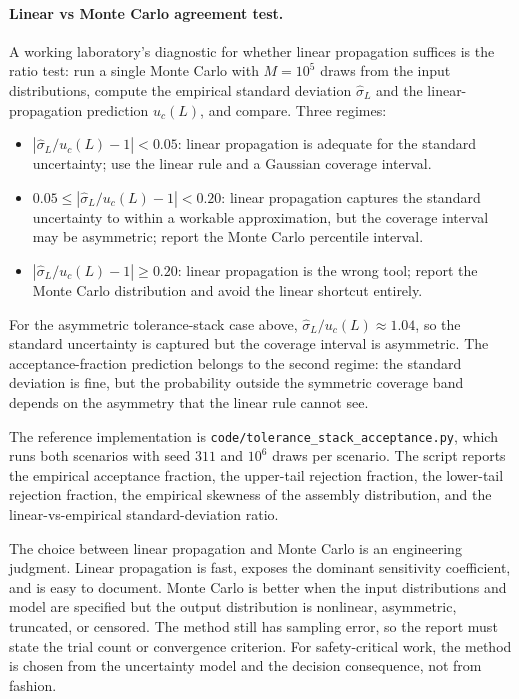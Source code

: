 \paragraph{Linear vs Monte Carlo agreement test.} A working
laboratory's diagnostic for whether linear propagation suffices is
the ratio test: run a single Monte Carlo with $M = 10^{5}$ draws
from the input distributions, compute the empirical standard
deviation $\hat{\sigma}_{L}$ and the linear-propagation prediction
$u_{c}(L)$, and compare. Three regimes:

\begin{itemize}[leftmargin=*]
  \item $|\hat{\sigma}_{L}/u_{c}(L) - 1| < 0.05$: linear propagation
    is adequate for the standard uncertainty; use the linear rule
    and a Gaussian coverage interval.
  \item $0.05 \leq |\hat{\sigma}_{L}/u_{c}(L) - 1| < 0.20$: linear
    propagation captures the standard uncertainty to within a
    workable approximation, but the coverage interval may be
    asymmetric; report the Monte Carlo percentile interval.
  \item $|\hat{\sigma}_{L}/u_{c}(L) - 1| \geq 0.20$: linear
    propagation is the wrong tool; report the Monte Carlo
    distribution and avoid the linear shortcut entirely.
\end{itemize}

For the asymmetric tolerance-stack case above,
$\hat{\sigma}_{L}/u_{c}(L) \approx 1.04$, so the standard
uncertainty is captured but the coverage interval is asymmetric.
The acceptance-fraction prediction belongs to the second regime:
the standard deviation is fine, but the probability outside the
symmetric coverage band depends on the asymmetry that the linear
rule cannot see.

The reference implementation is
\texttt{code/tolerance\_stack\_acceptance.py}, which runs both
scenarios with seed $311$ and $10^{6}$ draws per scenario. The
script reports the empirical acceptance fraction, the upper-tail
rejection fraction, the lower-tail rejection fraction, the
empirical skewness of the assembly distribution, and the
linear-vs-empirical standard-deviation ratio.

\begin{mastery}
The choice between linear propagation and Monte Carlo is an
engineering judgment. Linear propagation is fast, exposes the
dominant sensitivity coefficient, and is easy to document. Monte
Carlo is better when the input distributions and model are specified
but the output distribution is nonlinear, asymmetric, truncated, or
censored. The method still has sampling error, so the report must
state the trial count or convergence criterion. For safety-critical
work, the method is chosen from the uncertainty model and the
decision consequence, not from fashion.
\end{mastery}

